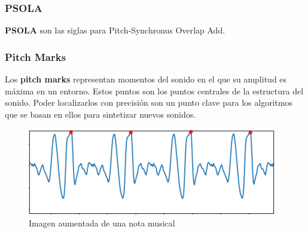 \subsubsection{PSOLA}
\textbf{PSOLA} son las siglas para Pitch-Synchronus Overlap Add.



\subsubsection{Pitch Marks}
Los \textbf{pitch marks} representan momentos del sonido en el que su amplitud es máxima en un entorno. Estos puntos son los puntos centrales de la estructura del sonido. Poder localizarlos con precisión son un punto clave para los algoritmos que se basan en ellos para sintetizar nuevos sonidos.
\begin{figure}[H]
	\centering
	\includegraphics[width=0.7\linewidth]{ImagenesEjercicio5/soundZoomPMS.PNG}
	\caption{Imagen aumentada de una nota musical}
	\label{fig:soundzoom}
\end{figure}



 











